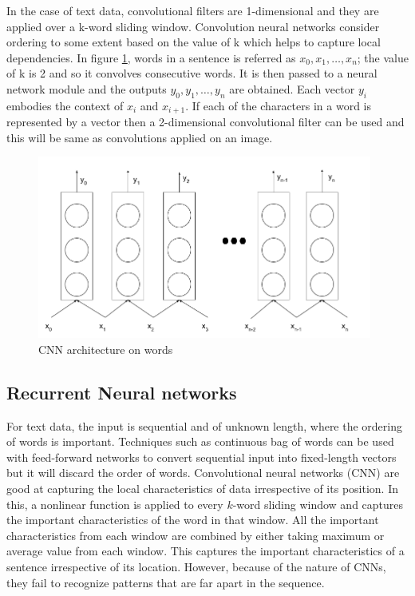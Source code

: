 \documentclass[a4paper, 11pt]{article}
\begin{document}
In the case of text data, convolutional filters are 1-dimensional and they are applied over a k-word sliding window. Convolution neural networks consider ordering to some extent based on the value of k which helps to capture local dependencies. In figure \ref{fig:Char CNN architecture}, words in a sentence is referred as $x_0, x_1, \dots, x_n$; the value of k is 2 and so it convolves consecutive words. It is then passed to a neural network module and the outputs $y_0, y_1, \dots, y_n$ are obtained. Each vector $y_i$ embodies the context of $x_i$ and $x_{i+1}$. If each of the characters in a word is represented by a vector then a 2-dimensional convolutional filter can be used and this will be same as convolutions applied on an image.
\begin{figure}[H]
    \centering
    \includegraphics[width=\textwidth,height=6cm,keepaspectratio=true]
    {cnn-2.png}
    \caption{
        CNN architecture on words
    }
    \label{fig:Char CNN architecture}
\end{figure}


\subsection{Recurrent Neural networks}


For text data, the input is sequential and of unknown length, where the ordering of words is important. Techniques such as continuous bag of words \parencite{DBLP:journals/corr/abs-1301-3781} can be used with feed-forward networks to convert sequential input into fixed-length vectors but it will discard the order of words. Convolutional neural networks (CNN) \parencite{Bengio1997} are good at capturing the local characteristics of data irrespective of its position. In this, a nonlinear function is applied to every $k$-word sliding window and captures the important characteristics of the word in that window. All the important characteristics from each window are combined by either taking maximum or average value from each window. This captures the important characteristics of a sentence irrespective of its location. However, because of the nature of CNNs, they fail to recognize patterns that are far apart in the sequence.
\end{document}
